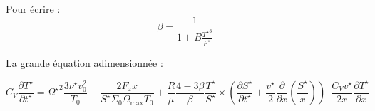 Pour écrire :
\begin{equation}
    \beta = \frac{1}{1 + B \frac{{T^\star}^3}{\rho^\star}}
\end{equation}

La grande équation adimensionnée :

\begin{equation}
    C_V \frac{\partial T^{\star}}{\partial t^{\star}} =
    {\Omega^\star}^2 \frac{3 \nu^\star v_0^2}{T_0} - \frac{2 F_z x}{S^\star \Sigma_0 \Omega_\mathrm{max} T_0} +
    \frac{R}{\mu} \frac{4-3\beta}{\beta} \frac{T^\star}{S^\star} ×
    \left( \frac{\partial S^\star}{\partial t^\star} + \frac{v^\star}{2} \frac{\partial}{\partial x} \left(\frac{S^\star}{x}\right) \right) –
    \frac{C_V v^\star}{2 x} \frac{\partial T^\star}{\partial x}
\end{equation}

